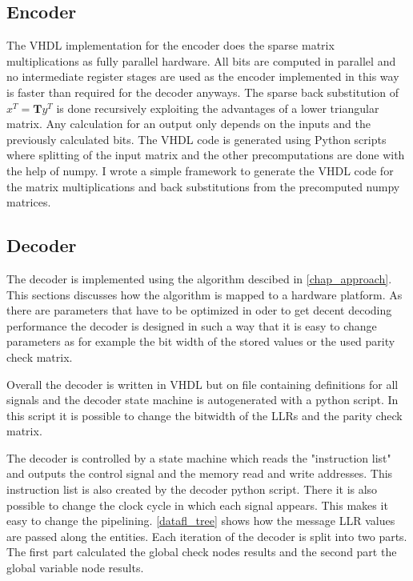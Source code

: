 \subsection{Encoder}
The VHDL implementation for the encoder does the sparse matrix multiplications as fully parallel hardware. All bits are computed in parallel and no intermediate register stages are used as the encoder implemented in this way is faster than required for the decoder anyways. The sparse back substitution of $x^T = \bm{T}y^T$ is done recursively exploiting the advantages of a lower triangular matrix. Any calculation for an output only depends on the inputs and the previously calculated bits. The VHDL code is generated using Python scripts where splitting of the input matrix and the other precomputations are done with the help of numpy. I wrote a simple framework to generate the VHDL code for the matrix multiplications and back substitutions from the precomputed numpy matrices. 

\subsection{Decoder}
The decoder is implemented using the algorithm descibed in \cref{chap_approach}. This sections discusses how the algorithm is mapped to a hardware platform. As there are parameters that have to be optimized in oder to get decent decoding performance the decoder is designed in such a way that it is easy to change parameters as for example the bit width of the stored values or the used parity check matrix. 

Overall the decoder is written in VHDL but on file containing definitions for all signals and the decoder state machine is autogenerated with a python script. In this script it is possible to change the bitwidth of the LLRs and the parity check matrix.

The decoder is controlled by a state machine which reads the "instruction list" and outputs the control signal and the memory read and write addresses. This instruction list is also created by the decoder python script. There it is also possible to change the clock cycle in which each signal appears. This makes it easy to change the pipelining. \cref{datafl_tree} shows how the message LLR values are passed along the entities. Each iteration of the decoder is split into two parts. The first part calculated the global check nodes results and the second part the global variable node results.

